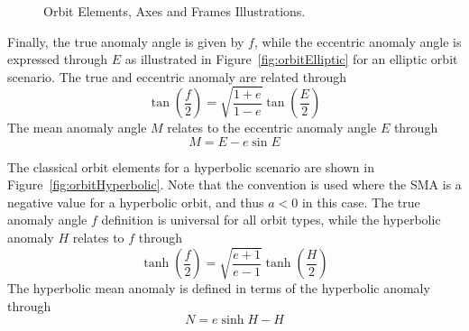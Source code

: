 \begin{figure}[t]
	\caption{Orbit Elements, Axes and Frames Illustrations.\cite{schaub}}
	\label{fig:orbitParameters}
\end{figure}

Finally, the true anomaly angle is given by $f$, while the eccentric anomaly angle is expressed through $E$ as illustrated in Figure~\ref{fig:orbitElliptic} for an elliptic orbit scenario.  The true and eccentric anomaly are related through\cite{schaub}
\begin{equation}
	\tan\left( \frac{f}{2} \right) = \sqrt{ \frac{1+e}{1-e} } \tan\left( \frac{E}{2} \right) 
\end{equation}
The mean anomaly angle $M$ relates to the eccentric anomaly angle $E$ through\cite{schaub}
\begin{equation}
	M = E - e \sin E
\end{equation}

The classical orbit elements for a hyperbolic scenario are shown in Figure~\ref{fig:orbitHyperbolic}.  Note that the convention is used where the SMA is a negative value for a hyperbolic orbit, and thus $a < 0$ in this case.  The true anomaly angle $f$ definition is universal for all orbit types, while the hyperbolic anomaly $H$ relates to $f$ through
\begin{equation}
	\tanh\left( \frac{f}{2} \right) = \sqrt{ \frac{e+1}{e-1}} \tanh\left( \frac{H}{2} \right) 
\end{equation}
The hyperbolic mean anomaly is defined in terms of the hyperbolic anomaly through
\begin{equation}
	N = e \sinh H - H
\end{equation}


